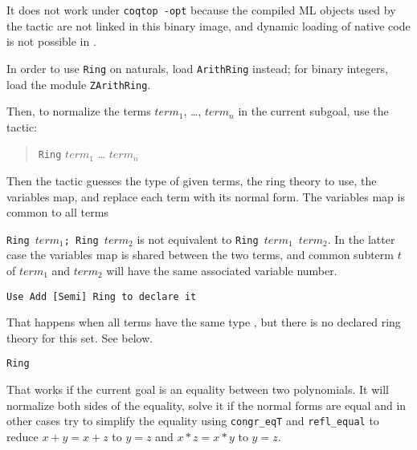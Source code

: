It does not work under \texttt{coqtop -opt} because the compiled ML
objects used by the tactic are not linked in this binary image, and
dynamic loading of native code is not possible in \ocaml.

In order to use \texttt{Ring} on naturals, load \texttt{ArithRing}
instead; for binary integers, load the module \texttt{ZArithRing}.

Then, to normalize the terms $term_1$, \dots, $term_n$ in
the current subgoal, use the tactic:

\begin{quotation}
\texttt{Ring} $term_1$ \dots{} $term_n$
\end{quotation}

Then the tactic guesses the type of given terms, the ring theory to
use, the variables map, and replace each term with its normal form.
The variables map is common to all terms

\Warning \texttt{Ring $term_1$; Ring $term_2$} is not equivalent to 
\texttt{Ring $term_1$ $term_2$}. In the latter case the variables map
is shared between the two terms, and common subterm $t$ of $term_1$
and $term_2$ will have the same associated variable number.

\begin{ErrMsgs}
\item {}
\item {}
\item {}

  \texttt{Use Add [Semi] Ring to declare it}

  That happens when all terms have the same type \term, but there is
  no declared ring theory for this set. See below.
\end{ErrMsgs}

\begin{Variants}
\item \texttt{Ring}

  That works if the current goal is an equality between two
  polynomials. It will normalize both sides of the
  equality, solve it if the normal forms are equal and in other cases
  try to simplify the equality using \texttt{congr\_eqT} and \texttt{refl\_equal}
  to reduce $x + y = x + z$ to $y = z$ and $x * z = x * y$ to $y = z$.

  \ErrMsg{}

\end{Variants}

